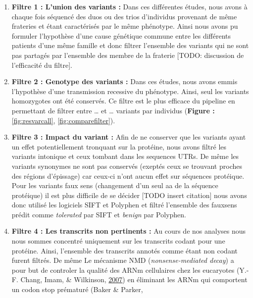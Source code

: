 \documentclass[12pt,twoside]{reedthesis}
\providecommand{\tightlist}{%
  \setlength{\itemsep}{0pt}\setlength{\parskip}{0pt}}
\theoremstyle{definition}
\theoremstyle{definition}
\theoremstyle{remark}
\begin{document}
  \begin{enumerate}
  \def\labelenumi{\arabic{enumi}.}
  \tightlist
  \item
    \textbf{Filtre 1 : L'union des variants :} Dans ces différentes
    études, nous avons à chaque fois séquencé des duos ou des trios
    d'individus provenant de même frateries et étant caractérisés par le
    même phénotype. Ainsi nous avons pu formuler l'hypothèse d'une cause
    génétique commune entre les différents patients d'une même famille et
    donc filtrer l'ensemble des variants qui ne sont pas partagés par
    l'ensemble des membre de la fraterie {[}TODO: discussion de
    l'efficacité du filtre{]}.\\
  \item
    \textbf{Filtre 2 : Genotype des variants :} Dans ces études, nous
    avons emmis l'hypothèse d'une transmission recessive du phénotype.
    Ainsi, seul les variants homozygotes ont été conservés. Ce filtre est
    le plus efficace du pipeline en permettant de filtrer entre \ldots{}
    et \ldots{} variants par individus (\textbf{Figure :
    }\ref{fig:resvarcall}, \ref{fig:comparefilter}).\\
  \item
    \textbf{Filtre 3 : Impact du variant :} Afin de ne conserver que les
    variants ayant un effet potentiellement tronquant sur la protéine,
    nous avons filtré les variants intonique et ceux tombant dans les
    sequences UTRs. De même les variants synonymes ne sont pas conservés
    (exeptés ceux se trouvant proches des régions d'épissage) car ceux-ci
    n'ont aucun effet sur séquences protéique. Pour les variants faux sens
    (changement d'un seul aa de la séquence protéique) il est plus
    difficile de se décider {[}TODO insert citation{]} nous avons donc
    utilisé les logiciels SIFT et Polyphen et filtré l'ensemble des
    fauxsens prédit comme \emph{tolerated} par SIFT et \emph{benign} par
    Polyphen.\\
  \item
    \textbf{Filtre 4 : Les transcrits non pertinents :} Au cours de nos
    analyses nous nous sommes concentré uniquement sur les transcrits
    codant pour une protéine. Ainsi, l'ensemble des transcrits annotés
    comme étant non codant furent filtrés. De même Le mécanisme NMD
    (\emph{nonsense-mediated decay}) a pour but de controler la qualité
    des ARNm cellulaires chez les eucaryotes (Y.-F. Chang, Imam, \&
    Wilkinson, \protect\hyperlink{ref-Chang2007}{2007}) en éliminant les
    ARNm qui comportent un codon stop prématuré (Baker \& Parker,

\end{enumerate}
\end{document}
